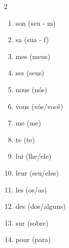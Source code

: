 \documentclass[a4paper,12pt]{article}
\begin{document}
\begin{multicols}{2}
\begin{enumerate}[label=\arabic*., start=1]
    \item son (seu - m)
    \item sa (sua - f)
    \item mes (meus)
    \item ses (seus)
    \item nous (nós)
    \item vous (vós/você)
    \item me (me)
    \item te (te)
    \item lui (lhe/ele)
    \item leur (seu/eles)
    \item les (os/as)
    \item des (dos/alguns)
    \item sur (sobre)
    \item pour (para)
\end{enumerate}
\end{multicols}
\end{document}
